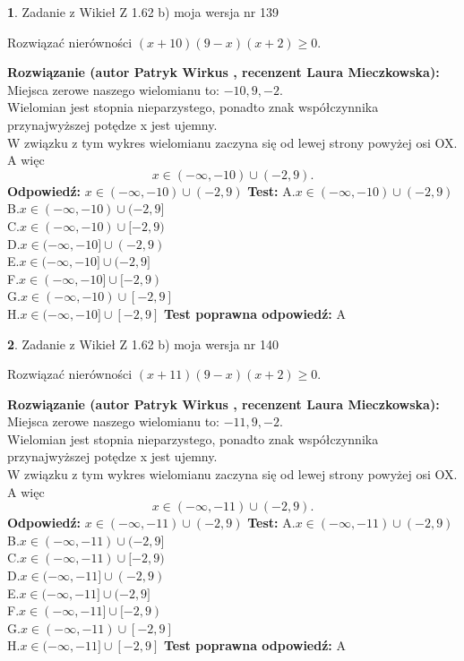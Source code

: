 \documentclass[12pt, a4paper]{article}
\theoremstyle{definition} %
\newtheorem{zad}{}
\newcommand{\zadStart}[1]{\begin{zad}#1\newline}
\newcommand{\zadStop}{\end{zad}}
\newcommand{\rozwStart}[2]{\noindent \textbf{Rozwiązanie (autor #1 , recenzent #2): }\newline}
\newcommand{\rozwStop}{\newline}
\newcommand{\odpStart}{\noindent \textbf{Odpowiedź:}\newline}
\newcommand{\odpStop}{\newline}
\newcommand{\testStart}{\noindent \textbf{Test:}\newline}
\newcommand{\testStop}{\newline}
\newcommand{\kluczStart}{\noindent \textbf{Test poprawna odpowiedź:}\newline}
\newcommand{\kluczStop}{\newline}
\begin{document}
\zadStart{Zadanie z Wikieł Z 1.62 b) moja wersja nr 139}

Rozwiązać nierówności $(x+10)(9-x)(x+2)\ge0$.
\zadStop
\rozwStart{Patryk Wirkus}{Laura Mieczkowska}
Miejsca zerowe naszego wielomianu to: $-10, 9, -2$.\\
Wielomian jest stopnia nieparzystego, ponadto znak współczynnika przy\linebreak najwyższej potędze x jest ujemny.\\ W związku z tym wykres wielomianu zaczyna się od lewej strony powyżej osi OX. A więc $$x \in (-\infty,-10) \cup (-2,9).$$
\rozwStop
\odpStart
$x \in (-\infty,-10) \cup (-2,9)$
\odpStop
\testStart
A.$x \in (-\infty,-10) \cup (-2,9)$\\
B.$x \in (-\infty,-10) \cup (-2,9]$\\
C.$x \in (-\infty,-10) \cup [-2,9)$\\
D.$x \in (-\infty,-10] \cup (-2,9)$\\
E.$x \in (-\infty,-10] \cup (-2,9]$\\
F.$x \in (-\infty,-10] \cup [-2,9)$\\
G.$x \in (-\infty,-10) \cup [-2,9]$\\
H.$x \in (-\infty,-10] \cup [-2,9]$
\testStop
\kluczStart
A
\kluczStop



\zadStart{Zadanie z Wikieł Z 1.62 b) moja wersja nr 140}

Rozwiązać nierówności $(x+11)(9-x)(x+2)\ge0$.
\zadStop
\rozwStart{Patryk Wirkus}{Laura Mieczkowska}
Miejsca zerowe naszego wielomianu to: $-11, 9, -2$.\\
Wielomian jest stopnia nieparzystego, ponadto znak współczynnika przy\linebreak najwyższej potędze x jest ujemny.\\ W związku z tym wykres wielomianu zaczyna się od lewej strony powyżej osi OX. A więc $$x \in (-\infty,-11) \cup (-2,9).$$
\rozwStop
\odpStart
$x \in (-\infty,-11) \cup (-2,9)$
\odpStop
\testStart
A.$x \in (-\infty,-11) \cup (-2,9)$\\
B.$x \in (-\infty,-11) \cup (-2,9]$\\
C.$x \in (-\infty,-11) \cup [-2,9)$\\
D.$x \in (-\infty,-11] \cup (-2,9)$\\
E.$x \in (-\infty,-11] \cup (-2,9]$\\
F.$x \in (-\infty,-11] \cup [-2,9)$\\
G.$x \in (-\infty,-11) \cup [-2,9]$\\
H.$x \in (-\infty,-11] \cup [-2,9]$
\testStop
\kluczStart
A
\kluczStop
\end{document}
